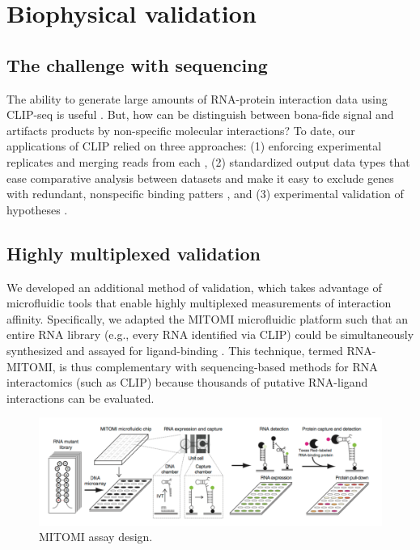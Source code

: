 
\chapter{Biophysical validation}

\section{The challenge with sequencing}

The ability to generate large amounts of RNA-protein interaction data using CLIP-seq is useful \cite{Konig:2012ww}. But, how can be distinguish between bona-fide signal and artifacts products by non-specific molecular interactions? To date, our applications of CLIP relied on three approaches: (1) enforcing experimental replicates and merging reads from each \cite{Flynn:2014bi}, (2) standardized output data types that ease comparative analysis between datasets and make it easy to exclude genes with redundant, nonspecific binding patters \cite{Flynn:2014bi}, and (3) experimental validation of hypotheses  \cite{Calo:2014ix}. 

\section{Highly multiplexed validation}

We developed an additional method of validation, which takes advantage of microfluidic tools that enable highly multiplexed measurements of interaction affinity. Specifically, we adapted the MITOMI \cite{Fordyce:2010fb} microfluidic platform such that an entire RNA library (e.g., every RNA identified via CLIP) could be simultaneously synthesized and assayed for ligand-binding \cite{Martin:2012cx}. This technique, termed RNA-MITOMI, is thus complementary with sequencing-based methods for RNA interactomics (such as CLIP) because thousands of putative RNA-ligand interactions can be evaluated.

\begin{figure}
\center\includegraphics[width=150mm,scale=0.5]{Figures/Fig28}
\caption{MITOMI assay design.}
\label{fig:Fig28}
\end{figure}

